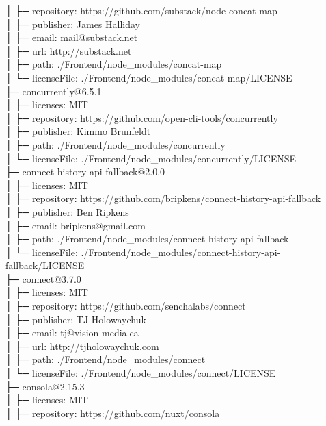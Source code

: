\documentclass[
    paper=a4,
    twoside=false,
    parskip=half,
    listof=entryprefix,
    listof=totoc,
    index=totoc,
    bibliography=totoc,
    headsepline,
]{scrbook}
\begin{document}
    │  ├─ repository: https://github.com/substack/node-concat-map\\
    │  ├─ publisher: James Halliday\\
    │  ├─ email: mail@substack.net\\
    │  ├─ url: http://substack.net\\
    │  ├─ path: ./Frontend/node\_modules/concat-map\\
    │  └─ licenseFile: ./Frontend/node\_modules/concat-map/LICENSE\\
    ├─ concurrently@6.5.1\\
    │  ├─ licenses: MIT\\
    │  ├─ repository: https://github.com/open-cli-tools/concurrently\\
    │  ├─ publisher: Kimmo Brunfeldt\\
    │  ├─ path: ./Frontend/node\_modules/concurrently\\
    │  └─ licenseFile: ./Frontend/node\_modules/concurrently/LICENSE\\
    ├─ connect-history-api-fallback@2.0.0\\
    │  ├─ licenses: MIT\\
    │  ├─ repository: https://github.com/bripkens/connect-history-api-fallback\\
    │  ├─ publisher: Ben Ripkens\\
    │  ├─ email: bripkens@gmail.com\\
    │  ├─ path: ./Frontend/node\_modules/connect-history-api-fallback\\
    │  └─ licenseFile: ./Frontend/node\_modules/connect-history-api-fallback/LICENSE\\
    ├─ connect@3.7.0\\
    │  ├─ licenses: MIT\\
    │  ├─ repository: https://github.com/senchalabs/connect\\
    │  ├─ publisher: TJ Holowaychuk\\
    │  ├─ email: tj@vision-media.ca\\
    │  ├─ url: http://tjholowaychuk.com\\
    │  ├─ path: ./Frontend/node\_modules/connect\\
    │  └─ licenseFile: ./Frontend/node\_modules/connect/LICENSE\\
    ├─ consola@2.15.3\\
    │  ├─ licenses: MIT\\
    │  ├─ repository: https://github.com/nuxt/consola\\
\end{document}
